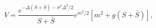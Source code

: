 \begin{equation}
V = \frac{e^{-\Delta(S + \bar S)-\sigma^2 \Delta^2/2}}{S + \bar S}
e^{m^2/2}[m^2+ g(S+\bar S)] ,
\end{equation}

